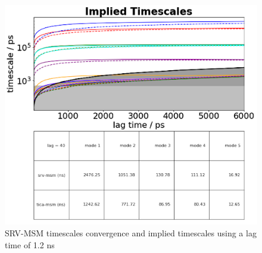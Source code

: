 \documentclass[journal=jpcbfk,manuscript=article]{achemso}
\begin{document}
\begin{figure}[ht!]
	\begin{center}
        \includegraphics[width=\textwidth]{Figs/figs_0804/AT-all_dynamic.png}
        \caption{SRV-MSM timescales convergence and implied timescales using a lag time of 1.2 ns}
        \label{fig:AT-all_dynamic}
	\end{center}
\end{figure}
\end{document}
